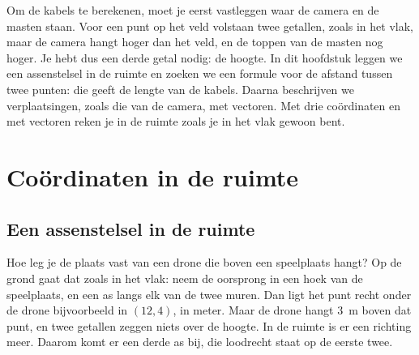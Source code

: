Om de kabels te berekenen, moet je eerst vastleggen waar de camera en de masten staan. Voor een punt op het veld volstaan twee getallen, zoals in het vlak, maar de camera hangt hoger dan het veld, en de toppen van de masten nog hoger. Je hebt dus een derde getal nodig: de hoogte. In dit hoofdstuk leggen we een assenstelsel in de ruimte en zoeken we een formule voor de afstand tussen twee punten: die geeft de lengte van de kabels. Daarna beschrijven we verplaatsingen, zoals die van de camera, met vectoren. Met drie coördinaten en met vectoren reken je in de ruimte zoals je in het vlak gewoon bent.

\begin{oefeningen}[Start]

\end{oefeningen}

\section{Coördinaten in de ruimte}

\subsection{Een assenstelsel in de ruimte}

Hoe leg je de plaats vast van een drone die boven een speelplaats hangt? Op de grond gaat dat zoals in het vlak: neem de oorsprong in een hoek van de speelplaats, en een as langs elk van de twee muren. Dan ligt het punt recht onder de drone bijvoorbeeld in $(12, 4)$, in meter. Maar de drone hangt $3$~m boven dat punt, en twee getallen zeggen niets over de hoogte. In de ruimte is er een richting meer. Daarom komt er een derde as bij, die loodrecht staat op de eerste twee.



